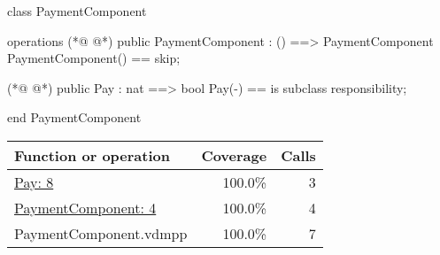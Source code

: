 \begin{vdmpp}
class PaymentComponent

operations
(*@
\label{PaymentComponent:4}
@*)
 public PaymentComponent : () ==> PaymentComponent
 PaymentComponent() == 
 skip;
 
(*@
\label{Pay:8}
@*)
 public Pay : nat ==> bool
 Pay(-) == is subclass responsibility;
 
end PaymentComponent
\end{vdmpp}
\bigskip
\begin{longtable}{|l|r|r|}
\hline
Function or operation & Coverage & Calls \\
\hline
\hline
\hyperref[Pay:8]{Pay: 8} & 100.0\% & 3 \\
\hline
\hyperref[PaymentComponent:4]{PaymentComponent: 4} & 100.0\% & 4 \\
\hline
\hline
PaymentComponent.vdmpp & 100.0\% & 7 \\
\hline
\end{longtable}

